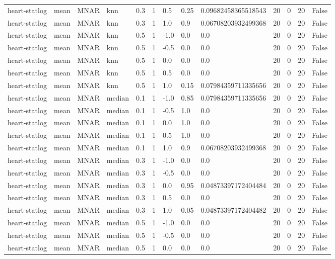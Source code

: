 \begin{tabular}{lllllllllllll}
heart-statlog & mean & MNAR & knn & 0.3 & 1 & 0.5 & 0.25 & 0.09682458365518543 & 20 & 0 & 20 & False \\
heart-statlog & mean & MNAR & knn & 0.3 & 1 & 1.0 & 0.9 & 0.06708203932499368 & 20 & 0 & 20 & False \\
heart-statlog & mean & MNAR & knn & 0.5 & 1 & -1.0 & 0.0 & 0.0 & 20 & 0 & 20 & False \\
heart-statlog & mean & MNAR & knn & 0.5 & 1 & -0.5 & 0.0 & 0.0 & 20 & 0 & 20 & False \\
heart-statlog & mean & MNAR & knn & 0.5 & 1 & 0.0 & 0.0 & 0.0 & 20 & 0 & 20 & False \\
heart-statlog & mean & MNAR & knn & 0.5 & 1 & 0.5 & 0.0 & 0.0 & 20 & 0 & 20 & False \\
heart-statlog & mean & MNAR & knn & 0.5 & 1 & 1.0 & 0.15 & 0.07984359711335656 & 20 & 0 & 20 & False \\
heart-statlog & mean & MNAR & median & 0.1 & 1 & -1.0 & 0.85 & 0.07984359711335656 & 20 & 0 & 20 & False \\
heart-statlog & mean & MNAR & median & 0.1 & 1 & -0.5 & 1.0 & 0.0 & 20 & 0 & 20 & False \\
heart-statlog & mean & MNAR & median & 0.1 & 1 & 0.0 & 1.0 & 0.0 & 20 & 0 & 20 & False \\
heart-statlog & mean & MNAR & median & 0.1 & 1 & 0.5 & 1.0 & 0.0 & 20 & 0 & 20 & False \\
heart-statlog & mean & MNAR & median & 0.1 & 1 & 1.0 & 0.9 & 0.06708203932499368 & 20 & 0 & 20 & False \\
heart-statlog & mean & MNAR & median & 0.3 & 1 & -1.0 & 0.0 & 0.0 & 20 & 0 & 20 & False \\
heart-statlog & mean & MNAR & median & 0.3 & 1 & -0.5 & 0.0 & 0.0 & 20 & 0 & 20 & False \\
heart-statlog & mean & MNAR & median & 0.3 & 1 & 0.0 & 0.95 & 0.04873397172404484 & 20 & 0 & 20 & False \\
heart-statlog & mean & MNAR & median & 0.3 & 1 & 0.5 & 0.0 & 0.0 & 20 & 0 & 20 & False \\
heart-statlog & mean & MNAR & median & 0.3 & 1 & 1.0 & 0.05 & 0.04873397172404482 & 20 & 0 & 20 & False \\
heart-statlog & mean & MNAR & median & 0.5 & 1 & -1.0 & 0.0 & 0.0 & 20 & 0 & 20 & False \\
heart-statlog & mean & MNAR & median & 0.5 & 1 & -0.5 & 0.0 & 0.0 & 20 & 0 & 20 & False \\
heart-statlog & mean & MNAR & median & 0.5 & 1 & 0.0 & 0.0 & 0.0 & 20 & 0 & 20 & False \\

\end{tabular}
